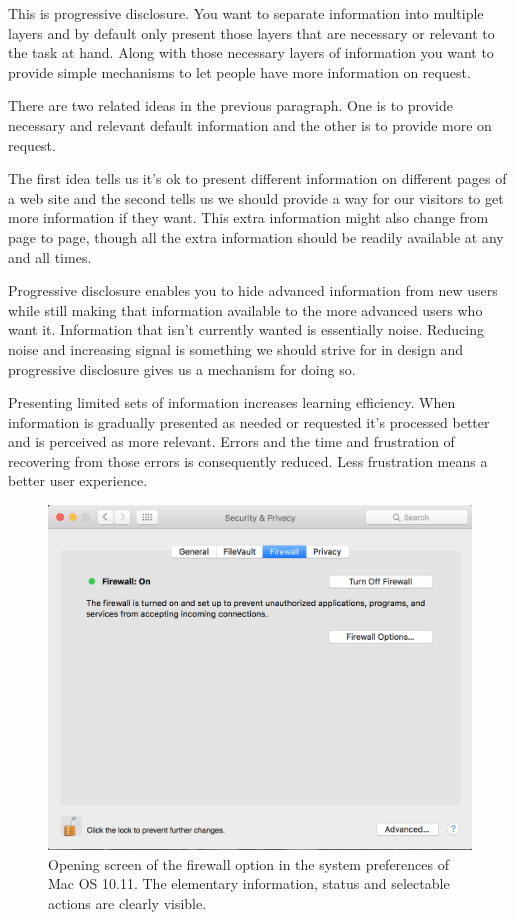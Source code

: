 This is progressive disclosure. You want to separate information into multiple layers and by default only present those layers that are necessary or relevant to the task at hand. Along with those necessary layers of information you want to provide simple mechanisms to let people have more information on request.

There are two related ideas in the previous paragraph. One is to provide necessary and relevant default information and the other is to provide more on request.

The first idea tells us it’s ok to present different information on different pages of a web site and the second tells us we should provide a way for our visitors to get more information if they want. This extra information might also change from page to page, though all the extra information should be readily available at any and all times.

Progressive disclosure enables you to hide advanced information from new users while still making that information available to the more advanced users who want it. Information that isn’t currently wanted is essentially noise. Reducing noise and increasing signal is something we should strive for in design and progressive disclosure gives us a mechanism for doing so.

Presenting limited sets of information increases learning efficiency. When information is gradually presented as needed or requested it’s processed better and is perceived as more relevant. Errors and the time and frustration of recovering from those errors is consequently reduced. Less frustration means a better user experience.

\begin{figure}[!h] 
  \includegraphics[width=1.0\textwidth]{../figures/firewall_start.png}
  \caption{Opening screen of the firewall option in the system preferences of Mac OS 10.11. The elementary information, status and selectable actions are clearly visible.}
  \label{fig:firewall_start}
\end{figure}


